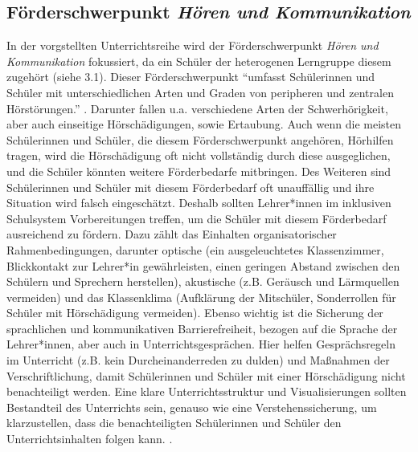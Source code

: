 \documentclass[12pt]{article}
\begin{document}
\subsection{Förderschwerpunkt \textit{Hören und Kommunikation}}
In der vorgstellten Unterrichtsreihe wird der Förderschwerpunkt \textit{Hören und Kommunikation} fokussiert, da ein Schüler der heterogenen Lerngruppe diesem zugehört (siehe 3.1). Dieser Förderschwerpunkt \enquote{umfasst Schülerinnen und Schüler mit unterschiedlichen Arten und Graden von peripheren und zentralen Hörstörungen.} \autocite[vgl.][]{prof_dr_thomas_kaul_forderschwerpunkt_2016}. Darunter fallen u.a. verschiedene Arten der Schwerhörigkeit, aber auch einseitige Hörschädigungen, sowie Ertaubung. Auch wenn die meisten Schülerinnen und Schüler, die diesem Förderschwerpunkt angehören, Hörhilfen tragen, wird die Hörschädigung oft nicht vollständig durch diese ausgeglichen, und die Schüler könnten weitere Förderbedarfe mitbringen. Des Weiteren sind Schülerinnen und Schüler mit diesem Förderbedarf oft unauffällig und ihre Situation wird falsch eingeschätzt. Deshalb sollten Lehrer*innen im inklusiven Schulsystem Vorbereitungen treffen, um die Schüler mit diesem Förderbedarf ausreichend zu fördern. Dazu zählt das Einhalten organisatorischer Rahmenbedingungen, darunter optische (ein ausgeleuchtetes Klassenzimmer, Blickkontakt zur Lehrer*in gewährleisten, einen geringen Abstand zwischen den Schülern und Sprechern herstellen), akustische (z.B. Geräusch und Lärmquellen vermeiden) und das Klassenklima (Aufklärung der Mitschüler, Sonderrollen für Schüler mit Hörschädigung vermeiden). Ebenso wichtig ist die Sicherung der sprachlichen und kommunikativen Barrierefreiheit, bezogen auf die Sprache der Lehrer*innen, aber auch in Unterrichtsgesprächen. Hier helfen Gesprächsregeln im Unterricht (z.B. kein Durcheinanderreden zu dulden) und Maßnahmen der Verschriftlichung, damit Schülerinnen und Schüler mit einer Hörschädigung nicht benachteiligt werden. Eine klare Unterrichtsstruktur und Visualisierungen sollten Bestandteil des Unterrichts sein, genauso wie  eine Verstehenssicherung, um klarzustellen, dass die benachteiligten Schülerinnen und Schüler den Unterrichtsinhalten folgen kann. \autocite[vgl.][]{prof_dr_thomas_kaul_forderschwerpunkt_2016}.
\end{document}
